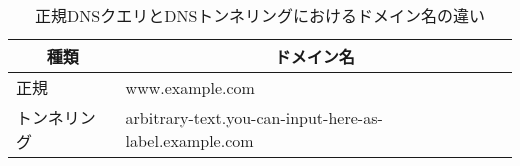 \begin{table}[th]
 \caption{正規DNSクエリとDNSトンネリングにおけるドメイン名の違い}
 \centering
  \begin{tabular}{l|l}
    \toprule
		\multicolumn{1}{c}{\textbf{種類}} & \multicolumn{1}{c}{\textbf{ドメイン名}} \\
    \midrule
    正規 &  www.example.com \\ \hline
    トンネリング & arbitrary-text.you-can-input-here-as-label.example.com\\
    \bottomrule
  \end{tabular}
 \label{tab:feature-tunnel}
\end{table}
